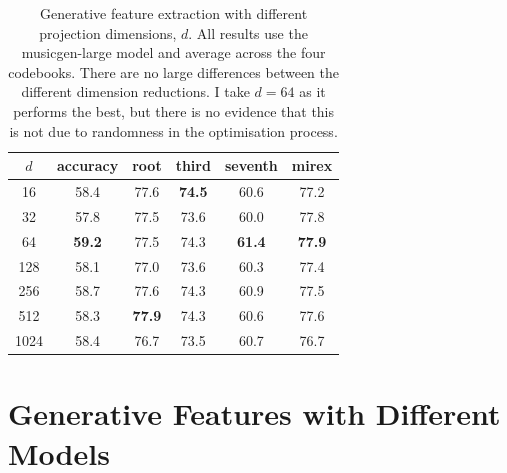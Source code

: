 \begin{table}[H]
    \centering
    \begin{tabular}{cccccc}
        \toprule
        $d$ & accuracy & root & third & seventh & mirex  \\  
        \midrule
        16   & 58.4       & 77.6       & \textbf{74.5} & 60.6       & 77.2       \\
        32   & 57.8       & 77.5       & 73.6          & 60.0       & 77.8       \\
        64   & \textbf{59.2} & 77.5    & 74.3          & \textbf{61.4} & \textbf{77.9} \\
        128  & 58.1       & 77.0       & 73.6          & 60.3       & 77.4       \\
        256  & 58.7       & 77.6       & 74.3          & 60.9       & 77.5       \\
        512  & 58.3       & \textbf{77.9} & 74.3      & 60.6       & 77.6       \\
        1024 & 58.4       & 76.7       & 73.5          & 60.7       & 76.7       \\ 
        \bottomrule
    \end{tabular}
    \caption{Generative feature extraction with different projection dimensions, $d$. All results use the musicgen-large model and average across the four codebooks. There are no large differences between the different dimension reductions. I take $d=64$ as it performs the best, but there is no evidence that this is not due to randomness in the optimisation process. }\label{tab:projection_dimensionality}
\end{table}

\section{Generative Features with Different Models}\label{app:generative_feature_extraction_models}

